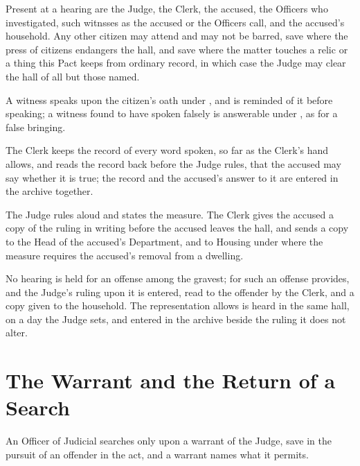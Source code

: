 \begin{clauses}
\item Present at a hearing are the Judge, the Clerk, the accused, the Officers who investigated, such witnsses as the accused or the Officers call, and the accused's household. Any other citizen may attend and may not be barred, save where the press of citizens endangers the hall, and save where the matter touches a relic or a thing this Pact keeps from ordinary record, in which case the Judge may clear the hall of all but those named.
\item A witness speaks upon the citizen's oath under , and is reminded of it before speaking; a witness found to have spoken falsely is answerable under , as for a false bringing.
\item The Clerk keeps the record of every word spoken, so far as the Clerk's hand allows, and reads the record back before the Judge rules, that the accused may say whether it is true; the record and the accused's answer to it are entered in the archive together.
\item The Judge rules aloud and states the measure. The Clerk gives the accused a copy of the ruling in writing before the accused leaves the hall, and sends a copy to the Head of the accused's Department, and to Housing under  where the measure requires the accused's removal from a dwelling.
\item No hearing is held for an offense among the gravest; for such an offense  provides, and the Judge's ruling upon it is entered, read to the offender by the Clerk, and a copy given to the household. The representation  allows is heard in the same hall, on a day the Judge sets, and entered in the archive beside the ruling it does not alter.
\end{clauses}

\section{The Warrant and the Return of a Search}
\label{sec:judicial:warrant-and-the-return-of-a-search}

An Officer of Judicial searches only upon a warrant of the Judge, save in the pursuit of an offender in the act, and a warrant names what it permits.

